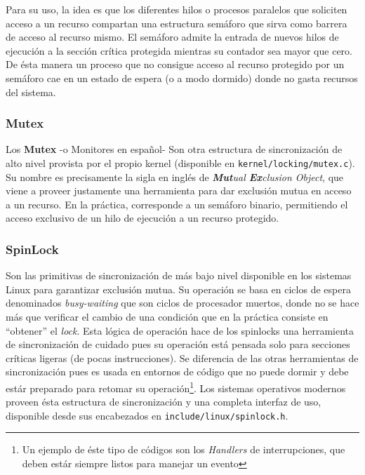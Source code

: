 Para su uso, la idea es que los diferentes hilos o procesos paralelos que soliciten acceso a un recurso compartan una estructura semáforo que sirva como barrera de acceso al recurso mismo. El semáforo admite la entrada de nuevos hilos de ejecución a la sección crítica protegida mientras su contador sea mayor que cero. De ésta manera un proceso que no consigue acceso al recurso protegido por un semáforo cae en un estado de espera (o a modo dormido) donde no gasta recursos del sistema.

\subsubsection{Mutex}
Los \textbf{Mutex} -o Monitores en español- Son otra estructura de sincronización de alto nivel provista por el propio kernel (disponible en \verb=kernel/locking/mutex.c=). Su nombre es precisamente la sigla en inglés de \emph{\textbf{Mut}ual \textbf{Ex}clusion Object}, que viene a proveer justamente una herramienta para dar exclusión mutua en acceso a un recurso. En la práctica, corresponde a un semáforo binario, permitiendo el acceso exclusivo de un hilo de ejecución a un recurso protegido.

\subsubsection{SpinLock}
Son las primitivas de sincronización de más bajo nivel disponible en los sistemas Linux para garantizar exclusión mutua. Su operación se basa en ciclos de espera denominados \emph{busy-waiting} que son ciclos de procesador muertos, donde no se hace más que verificar el cambio de una condición que en la práctica consiste en ``obtener'' el \emph{lock}. Esta lógica de operación hace de los spinlocks una herramienta de sincronización de cuidado pues su operación está pensada solo para secciones críticas ligeras (de pocas instrucciones). Se diferencia de las otras herramientas de sincronización pues es usada en entornos de código que no puede dormir y debe estár preparado para retomar su operación\footnote{Un ejemplo de éste tipo de códigos son los \textit{Handlers} de interrupciones, que deben estár siempre listos para manejar un evento}. Los sistemas operativos modernos proveen ésta estructura de sincronización y una completa interfaz de uso, disponible desde sus encabezados en \verb=include/linux/spinlock.h=.

